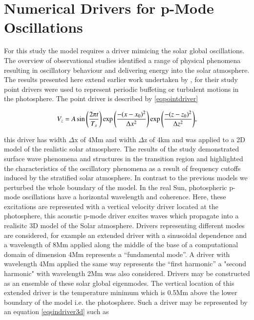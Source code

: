 \documentclass[authoryear,final,1p]{elsarticle}
\begin{document}

\section{Numerical Drivers for p-Mode Oscillations}
For this study the model requires a driver mimicing the solar global oscillations.  The overview of observational studies identified a range of physical phenomena resulting in oscillatory behaviour and delivering energy into the solar atmosphere.  The results presented here extend earlier work undertaken by  \citet{Malins2007A}, for their study point drivers were used to represent periodic buffeting or turbulent motions in the photosphere. The point driver is described by \eqref{eqpointdriver} 

\begin{equation}\label{eqpointdriver}
V_{z}=A \sin{\left({2\pi t}\over{T_s} \right)  }  \exp{\left( -{(x-x_0)^{2}}\over{\Delta x^{2}} \right) } \exp{\left( -{(z-z_0)^{2}}\over{\Delta z^{2}} \right) },
\end{equation}

this driver has width  $\Delta$x of 4Mm and width $\Delta$z  of 4km and was applied to a 2D model of the realistic solar atmosphere. The results of the study demonstrated surface wave phenomena and structures in the transition region and highlighted the characteristics of the oscillatory phenomena as a result of frequency cutoffs induced by the stratified solar atmosphere. In contrast to the previous models we perturbed the whole boundary of the model.  In the real Sun, photospheric p-mode oscillations have a horizontal wavelength and coherence. Here, these excitations are represented with a vertical velocity driver located at the photosphere, this acoustic p-mode driver excites waves which propagate into a realisitc 3D model of the Solar atmosphere. Drivers representing different modes are considered, for example  an extended driver with a sinusoidal dependence and a wavelength of 8Mm applied along the middle of the base of a computational domain of dimension 4Mm represents  a “fundamental mode”. A driver with wavelength 4Mm applied the same way represents the “first harmonic” a "second harmonic" with wavelength 2Mm was also considered. Drivers may be constructed as an ensemble of these solar global eigenmodes.  The vertical location of this extended driver is the temperature minimum which is 0.5Mm above the lower boundary of the model i.e. the photosphere. Such a driver may be represented by an equation \eqref{eqsindriver3d} such as  
\end{document}
